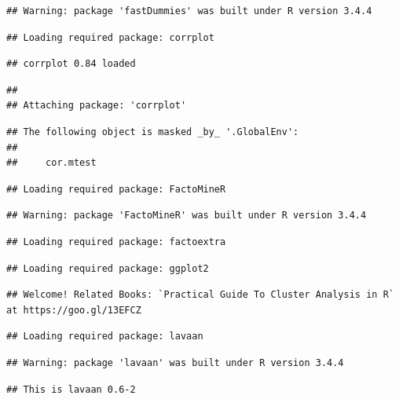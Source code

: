 \documentclass[11pt,]{article}
\begin{document}
\begin{verbatim}
## Warning: package 'fastDummies' was built under R version 3.4.4
\end{verbatim}

\begin{verbatim}
## Loading required package: corrplot
\end{verbatim}

\begin{verbatim}
## corrplot 0.84 loaded
\end{verbatim}

\begin{verbatim}
## 
## Attaching package: 'corrplot'
\end{verbatim}

\begin{verbatim}
## The following object is masked _by_ '.GlobalEnv':
## 
##     cor.mtest
\end{verbatim}

\begin{verbatim}
## Loading required package: FactoMineR
\end{verbatim}

\begin{verbatim}
## Warning: package 'FactoMineR' was built under R version 3.4.4
\end{verbatim}

\begin{verbatim}
## Loading required package: factoextra
\end{verbatim}

\begin{verbatim}
## Loading required package: ggplot2
\end{verbatim}

\begin{verbatim}
## Welcome! Related Books: `Practical Guide To Cluster Analysis in R` at https://goo.gl/13EFCZ
\end{verbatim}

\begin{verbatim}
## Loading required package: lavaan
\end{verbatim}

\begin{verbatim}
## Warning: package 'lavaan' was built under R version 3.4.4
\end{verbatim}

\begin{verbatim}
## This is lavaan 0.6-2
\end{verbatim}
\end{document}
